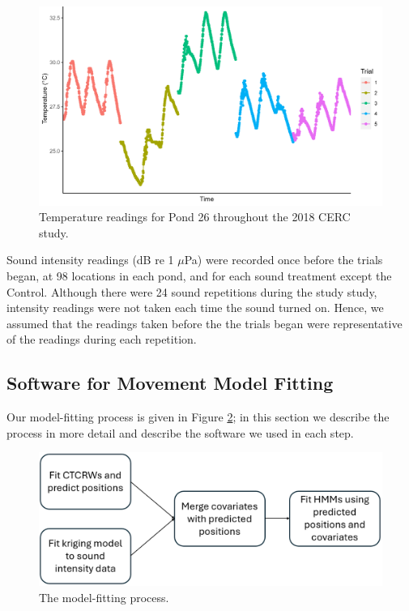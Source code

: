 \documentclass[12pt]{article}
\begin{document}
	\begin{figure}
		\includegraphics[width=\textwidth]{pond_26_temp.png}
		\caption{Temperature readings for Pond 26 throughout the 2018 CERC study.}
		\label{img:temperature}
	\end{figure}
	
	Sound intensity readings (dB re 1 $\mu$Pa) were recorded once before the trials began, at 98 locations in each pond, and for each sound treatment except the Control. Although there were 24 sound repetitions during the study study, intensity readings were not taken each time the sound turned on. Hence, we assumed that the readings taken before the the trials began were representative of the readings during each repetition. 		
	
	\subsection{Software for Movement Model Fitting}
	
	Our model-fitting process is given in Figure \ref{img:flowchart}; in this section we describe the process in more detail and describe the software we used in each step.
	
	\begin{figure}
		\includegraphics[width=\textwidth]{flowchart.png}
		\caption{The model-fitting process.}
		\label{img:flowchart}
	\end{figure}
		
\end{document}
